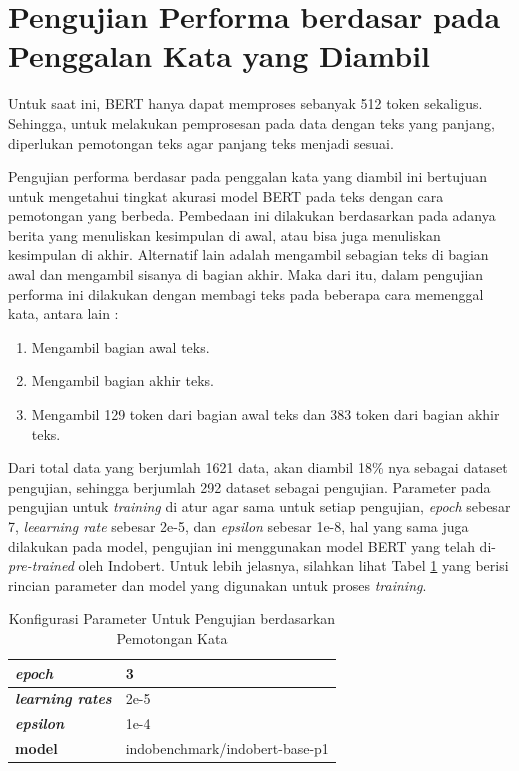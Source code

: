 \section{Pengujian Performa berdasar pada Penggalan Kata yang Diambil}

Untuk saat ini, BERT hanya dapat memproses sebanyak 512 token sekaligus. Sehingga, untuk melakukan pemprosesan pada data dengan teks yang panjang, diperlukan pemotongan teks agar panjang teks menjadi sesuai.

Pengujian performa berdasar pada penggalan kata yang diambil ini bertujuan untuk mengetahui tingkat akurasi model BERT pada teks dengan cara pemotongan yang berbeda. Pembedaan ini dilakukan berdasarkan pada adanya berita yang menuliskan kesimpulan di awal, atau bisa juga menuliskan kesimpulan di akhir. Alternatif lain adalah mengambil sebagian teks di bagian awal dan mengambil sisanya di bagian akhir. Maka dari itu, dalam pengujian performa ini dilakukan dengan membagi teks pada beberapa cara memenggal kata, antara lain :

\begin{enumerate}[nolistsep]
    \item Mengambil bagian awal teks.
    \item Mengambil bagian akhir teks.
    \item Mengambil 129 token dari bagian awal teks dan 383 token dari bagian akhir teks.
\end{enumerate}

Dari total data yang berjumlah 1621 data, akan diambil 18\% nya sebagai dataset pengujian, sehingga berjumlah 292 dataset sebagai pengujian. Parameter pada pengujian untuk \textit{training} di atur agar sama untuk setiap pengujian, \textit{epoch} sebesar 7, \textit{leearning rate} sebesar 2e-5, dan \textit{epsilon} sebesar 1e-8, hal yang sama juga dilakukan pada model, pengujian ini menggunakan model BERT yang telah di-\textit{pre-trained} oleh Indobert. Untuk lebih jelasnya, silahkan lihat Tabel \ref{tab: truncate_param} yang berisi rincian parameter dan model yang digunakan untuk proses \textit{training}.

\begin{table}
    \caption{Konfigurasi Parameter Untuk Pengujian berdasarkan Pemotongan Kata}
    \label{tab: truncate_param}
    \centering
    \begin{tabular}{|l|l|}
        \hline
        \textit{\textbf{epoch}}          & 3                              \\ \hline
        \textit{\textbf{learning rates}} & 2e-5                           \\ \hline
        \textit{\textbf{epsilon}}        & 1e-4                           \\ \hline
        \textbf{model}                   & indobenchmark/indobert-base-p1 \\ \hline
    \end{tabular}
\end{table}

